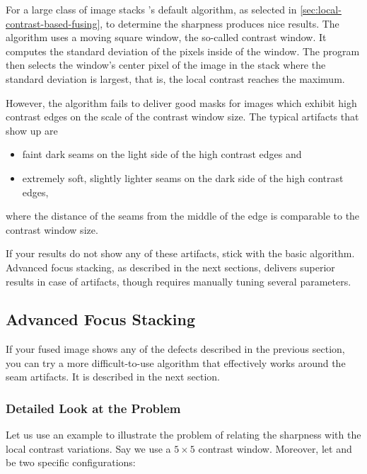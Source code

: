 For a large class of image stacks \App{}'s default algorithm, as
selected in \ref{sec:local-contrast-based-fusing}, to determine the
sharpness produces nice results.  The algorithm uses a moving square
window, the so-called contrast window.  It computes the standard
deviation of the pixels inside of the window.  The program then
selects the window's center pixel of the image in the stack where the
standard deviation is largest, that is, the local contrast reaches the
maximum.

However, the algorithm fails to deliver good masks for images which
exhibit high contrast edges on the scale of the contrast window size.
The typical artifacts that show up are
\begin{itemize}
\item
  faint dark seams on the light side of the high contrast edges and
\item
  extremely soft, slightly lighter seams on the dark side of the high
  contrast edges,
\end{itemize}
\noindent where the distance of the seams from the middle of the edge
is comparable to the contrast window size.

If your results do not show any of these artifacts, stick with the
basic algorithm.  Advanced focus stacking, as described in the next
sections, delivers superior results in case of artifacts, though
requires manually tuning several parameters.


\subsection[Advanced Focus Stacking]{Advanced Focus Stacking
  \label{sec:advanced-focus-stacking}
  }

If your fused image shows any of the defects described in the previous
section, you can try a more difficult-to-use algorithm that
effectively works around the seam artifacts.  It is described in the
next section.


\subsubsection[Detailed Look at the Problem]{Detailed Look at the Problem
  \label{sec:detailed-look-at-the-problem}
  }

Let us use an example to illustrate the problem of relating the
sharpness with the local contrast variations.  Say we use a $5 \times
5$ contrast window.  Moreover, let  and
 be two specific configurations:

